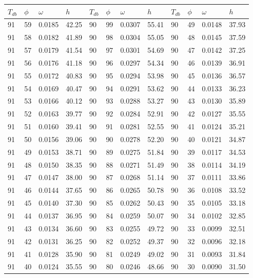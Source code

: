 \begin{tabular}{llll|llll|llll}
 \toprule 
\(T_{db}\) & \(\phi\) & \(\omega\) & \(h\) & \(T_{db}\) & \(\phi\) & \(\omega\) & \(h\) & \(T_{db}\) & \(\phi\) & \(\omega\) & \(h\)  \\ \midrule 
91 & 59 & 0.0185 & 42.25 & 90 & 99 & 0.0307 & 55.41 & 90 & 49 & 0.0148 & 37.93\\
91 & 58 & 0.0182 & 41.89 & 90 & 98 & 0.0304 & 55.05 & 90 & 48 & 0.0145 & 37.59\\
91 & 57 & 0.0179 & 41.54 & 90 & 97 & 0.0301 & 54.69 & 90 & 47 & 0.0142 & 37.25\\
91 & 56 & 0.0176 & 41.18 & 90 & 96 & 0.0297 & 54.34 & 90 & 46 & 0.0139 & 36.91\\
91 & 55 & 0.0172 & 40.83 & 90 & 95 & 0.0294 & 53.98 & 90 & 45 & 0.0136 & 36.57\\
91 & 54 & 0.0169 & 40.47 & 90 & 94 & 0.0291 & 53.62 & 90 & 44 & 0.0133 & 36.23\\
91 & 53 & 0.0166 & 40.12 & 90 & 93 & 0.0288 & 53.27 & 90 & 43 & 0.0130 & 35.89\\
91 & 52 & 0.0163 & 39.77 & 90 & 92 & 0.0284 & 52.91 & 90 & 42 & 0.0127 & 35.55\\
91 & 51 & 0.0160 & 39.41 & 90 & 91 & 0.0281 & 52.55 & 90 & 41 & 0.0124 & 35.21\\
91 & 50 & 0.0156 & 39.06 & 90 & 90 & 0.0278 & 52.20 & 90 & 40 & 0.0121 & 34.87\\
91 & 49 & 0.0153 & 38.71 & 90 & 89 & 0.0275 & 51.84 & 90 & 39 & 0.0117 & 34.53\\
91 & 48 & 0.0150 & 38.35 & 90 & 88 & 0.0271 & 51.49 & 90 & 38 & 0.0114 & 34.19\\
91 & 47 & 0.0147 & 38.00 & 90 & 87 & 0.0268 & 51.14 & 90 & 37 & 0.0111 & 33.86\\
91 & 46 & 0.0144 & 37.65 & 90 & 86 & 0.0265 & 50.78 & 90 & 36 & 0.0108 & 33.52\\
91 & 45 & 0.0140 & 37.30 & 90 & 85 & 0.0262 & 50.43 & 90 & 35 & 0.0105 & 33.18\\
91 & 44 & 0.0137 & 36.95 & 90 & 84 & 0.0259 & 50.07 & 90 & 34 & 0.0102 & 32.85\\
91 & 43 & 0.0134 & 36.60 & 90 & 83 & 0.0255 & 49.72 & 90 & 33 & 0.0099 & 32.51\\
91 & 42 & 0.0131 & 36.25 & 90 & 82 & 0.0252 & 49.37 & 90 & 32 & 0.0096 & 32.18\\
91 & 41 & 0.0128 & 35.90 & 90 & 81 & 0.0249 & 49.02 & 90 & 31 & 0.0093 & 31.84\\
91 & 40 & 0.0124 & 35.55 & 90 & 80 & 0.0246 & 48.66 & 90 & 30 & 0.0090 & 31.50\\

\end{tabular}
